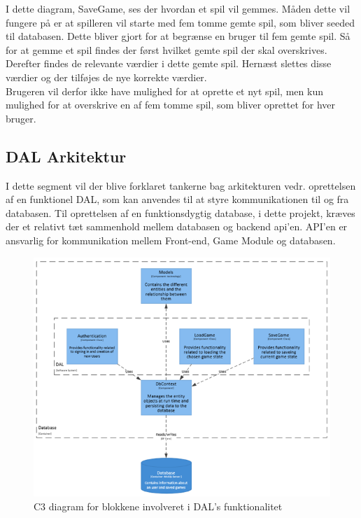 I dette diagram, SaveGame, ses der hvordan et spil vil gemmes. Måden dette vil fungere på er at spilleren vil starte med fem tomme gemte spil, som bliver seeded til databasen. Dette bliver gjort for at begrænse en bruger til fem gemte spil. Så for at gemme et spil findes der først hvilket gemte spil der skal overskrives. Derefter findes de relevante værdier i dette gemte spil. Hernæst slettes disse værdier og der tilføjes de nye korrekte værdier.\\
Brugeren vil derfor ikke have mulighed for at oprette et nyt spil, men kun mulighed for at overskrive en af fem tomme spil, som bliver oprettet for hver bruger.



\subsection{DAL Arkitektur}
I dette segment vil der blive forklaret tankerne bag arkitekturen vedr. oprettelsen af en funktionel DAL, som kan anvendes til at styre kommunikationen til og fra databasen.
Til oprettelsen af en funktionsdygtig database, i dette projekt, kræves der et relativt tæt sammenhold mellem databasen og backend api’en. API’en er ansvarlig for kommunikation mellem Front-end, Game Module og databasen.

\begin{figure}[H]
\centering
\includegraphics[width = \textwidth]{02-Body/Images/DALArkitektur}
\caption{C3 diagram for blokkene involveret i DAL's funktionalitet}
\label{fig:DALArkitektur}
\end{figure}


